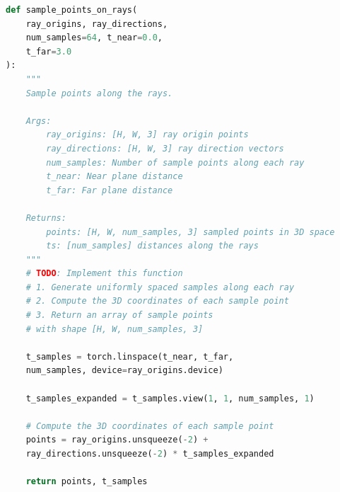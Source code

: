 \documentclass[12pt]{article}
\begin{document}
\begin{lstlisting}[language=python]
def sample_points_on_rays(
    ray_origins, ray_directions, 
    num_samples=64, t_near=0.0, 
    t_far=3.0
):
    """
    Sample points along the rays.

    Args:
        ray_origins: [H, W, 3] ray origin points
        ray_directions: [H, W, 3] ray direction vectors
        num_samples: Number of sample points along each ray
        t_near: Near plane distance
        t_far: Far plane distance

    Returns:
        points: [H, W, num_samples, 3] sampled points in 3D space
        ts: [num_samples] distances along the rays
    """
    # TODO: Implement this function
    # 1. Generate uniformly spaced samples along each ray
    # 2. Compute the 3D coordinates of each sample point
    # 3. Return an array of sample points 
    # with shape [H, W, num_samples, 3]

    t_samples = torch.linspace(t_near, t_far, 
    num_samples, device=ray_origins.device)

    t_samples_expanded = t_samples.view(1, 1, num_samples, 1)

    # Compute the 3D coordinates of each sample point
    points = ray_origins.unsqueeze(-2) + 
    ray_directions.unsqueeze(-2) * t_samples_expanded

    return points, t_samples
\end{lstlisting}
\end{document}
